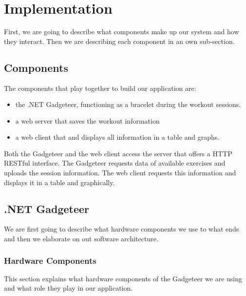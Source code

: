 \documentclass{tk3-team}
\begin{document}
\section{Implementation}

First, we are going to describe what components make up our system and how they interact. Then we are describing each component in an own sub-section.

\subsection{Components}
The components that play together to build our application are:
\begin{itemize}
	\item the .NET Gadgeteer, functioning as a bracelet during the workout sessions.
	\item a web server that saves the workout information 
	\item  a web client that and displays all information in a table and graphs.
\end{itemize}

Both the Gadgeteer and the web client access the server that offers a HTTP RESTful interface. The Gadgeteer requests data of available exercises  and uploads the session information. The web client requests this information and displays it in a table and graphically.

\subsection{.NET Gadgeteer}

We are first going to describe what hardware components we use to what ends and then we elaborate on out software architecture.

\subsubsection{Hardware Components}

This section explains what hardware components of the Gadgeteer we are using and what role they play in our application.
\end{document}
